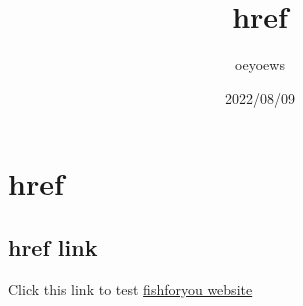\documentclass{article}
\title{href}
\author{oeyoews}
\date{2022/08/09}
\begin{document}
\maketitle


\section{href}

\subsection{href link}%

Click this link to test
\href{https://oeyoew.fun}{fishforyou website}
\end{document}
